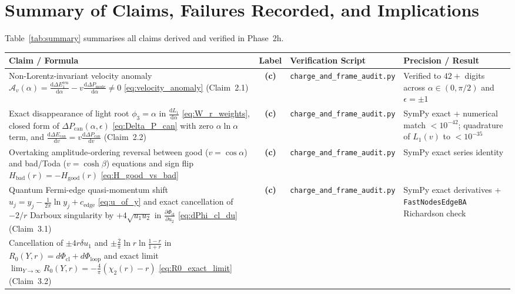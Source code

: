 \documentclass[11pt,a4paper]{article}
\newcommand{\dd}{\mathrm{d}}
\begin{document}
\section{Summary of Claims, Failures Recorded, and Implications}
\label{sec:summary}

Table~\ref{tab:summary} summarises all claims derived and verified in Phase~2h.

\begin{table}[ht]
\centering
\footnotesize
\begin{tabular}{@{}p{6.6cm}cp{4.4cm}p{3.6cm}@{}}
\toprule
Claim / Formula & Label & Verification Script & Precision / Result \\
\midrule
Non-Lorentz-invariant velocity anomaly $\mathcal{A}_v(\alpha) = \frac{\dd\Delta E_1^{\mathrm{ren}}}{\dd\alpha} - v\frac{\dd\Delta P_{\mathrm{mode}}}{\dd\alpha} \neq 0$ \eqref{eq:velocity_anomaly} (Claim~2.1) &
\textbf{(c)} & \texttt{charge\_and\_frame\_audit.py} &
Verified to $42+$ digits across $\alpha \in (0,\pi/2)$ and $\epsilon = \pm 1$ \\
\addlinespace
Exact disappearance of light root $\phi_3=\alpha$ in $\frac{\dd L_1}{\dd\alpha}$ \eqref{eq:W_r_weights}, closed form of $\Delta P_{\mathrm{can}}(\alpha,\epsilon)$ \eqref{eq:Delta_P_can} with zero $\alpha\ln\alpha$ term, and $\frac{\dd\Delta E_{\mathrm{can}}}{\dd v} = v\frac{\dd\Delta P_{\mathrm{can}}}{\dd v}$ (Claim~2.2) &
\textbf{(c)} & \texttt{charge\_and\_frame\_audit.py} &
SymPy exact + numerical match $< 10^{-42}$; quadrature of $L_1(v)$ to $< 10^{-35}$ \\
\addlinespace
Overtaking amplitude-ordering reversal between good ($v=\cos\alpha$) and bad/Toda ($v=\cosh\beta$) equations and sign flip $H_{\mathrm{bad}}(r) = -H_{\mathrm{good}}(r)$ \eqref{eq:H_good_vs_bad} &
\textbf{(c)} & \texttt{charge\_and\_frame\_audit.py} &
SymPy exact series identity \\
\addlinespace
Quantum Fermi-edge quasi-momentum shift $u_j = y_j - \frac{1}{2\pi}\ln y_j + c_{\mathrm{edge}}$ \eqref{eq:u_of_y} and exact cancellation of $-2/r$ Darboux singularity by $+4\sqrt{u_1 u_2}$ in $\frac{\partial\Phi_{\mathrm{cl}}}{\partial u_2}$ \eqref{eq:dPhi_cl_du} (Claim~3.1) &
\textbf{(c)} & \texttt{charge\_and\_frame\_audit.py} &
SymPy exact derivatives + \texttt{FastNodesEdgeBA} Richardson check \\
\addlinespace
Cancellation of $\pm 4r\delta u_1$ and $\pm\frac{2}{\pi}\ln r\ln\frac{1-r}{1+r}$ in $R_0(Y,r) = d\Phi_{\mathrm{cl}} + d\Phi_{\mathrm{loop}}$ and exact limit $\lim_{Y\to\infty} R_0(Y,r) = -\frac{4}{\pi}(\chi_2(r)-r)$ \eqref{eq:R0_exact_limit} (Claim~3.2) &

\end{tabular}
\end{table}
\end{document}
